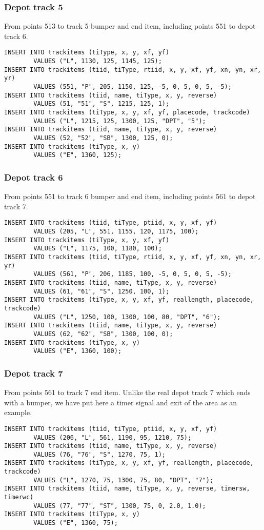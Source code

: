 \documentclass[12pt,a4paper]{article}
\begin{document}
\subsubsection{Depot track 5}
From points 513 to track 5 bumper and end item, including points 551 to depot track 6.
\begin{verbatim}
INSERT INTO trackitems (tiType, x, y, xf, yf)
        VALUES ("L", 1130, 125, 1145, 125);
INSERT INTO trackitems (tiid, tiType, rtiid, x, y, xf, yf, xn, yn, xr, yr) 
        VALUES (551, "P", 205, 1150, 125, -5, 0, 5, 0, 5, -5);
INSERT INTO trackitems (tiid, name, tiType, x, y, reverse)
        VALUES (51, "51", "S", 1215, 125, 1);
INSERT INTO trackitems (tiType, x, y, xf, yf, placecode, trackcode)
        VALUES ("L", 1215, 125, 1300, 125, "DPT", "5");
INSERT INTO trackitems (tiid, name, tiType, x, y, reverse)
        VALUES (52, "52", "SB", 1300, 125, 0);
INSERT INTO trackitems (tiType, x, y)
        VALUES ("E", 1360, 125);
\end{verbatim}

\subsubsection{Depot track 6}
From points 551 to track 6 bumper and end item, including points 561 to depot track 7.
\begin{verbatim}
INSERT INTO trackitems (tiid, tiType, ptiid, x, y, xf, yf)
        VALUES (205, "L", 551, 1155, 120, 1175, 100);
INSERT INTO trackitems (tiType, x, y, xf, yf)
        VALUES ("L", 1175, 100, 1180, 100);
INSERT INTO trackitems (tiid, tiType, rtiid, x, y, xf, yf, xn, yn, xr, yr) 
        VALUES (561, "P", 206, 1185, 100, -5, 0, 5, 0, 5, -5);
INSERT INTO trackitems (tiid, name, tiType, x, y, reverse)
        VALUES (61, "61", "S", 1250, 100, 1);
INSERT INTO trackitems (tiType, x, y, xf, yf, reallength, placecode, trackcode)
        VALUES ("L", 1250, 100, 1300, 100, 80, "DPT", "6");
INSERT INTO trackitems (tiid, name, tiType, x, y, reverse)
        VALUES (62, "62", "SB", 1300, 100, 0);
INSERT INTO trackitems (tiType, x, y)
        VALUES ("E", 1360, 100);
\end{verbatim}

\subsubsection{Depot track 7}
From points 561 to track 7 end item. Unlike the real depot track 7 which ends with a bumper, we have put here a timer signal and exit of the area as an example.
\begin{verbatim}
INSERT INTO trackitems (tiid, tiType, ptiid, x, y, xf, yf)
        VALUES (206, "L", 561, 1190, 95, 1210, 75);
INSERT INTO trackitems (tiid, name, tiType, x, y, reverse)
        VALUES (76, "76", "S", 1270, 75, 1);
INSERT INTO trackitems (tiType, x, y, xf, yf, reallength, placecode, trackcode)
        VALUES ("L", 1270, 75, 1300, 75, 80, "DPT", "7");
INSERT INTO trackitems (tiid, name, tiType, x, y, reverse, timersw, timerwc)
        VALUES (77, "77", "ST", 1300, 75, 0, 2.0, 1.0);
INSERT INTO trackitems (tiType, x, y)
        VALUES ("E", 1360, 75); 
\end{verbatim}
\end{document}
